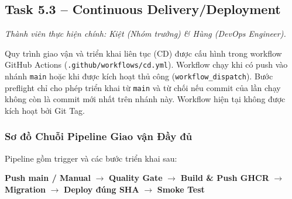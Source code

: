 \documentclass[a4paper]{article}
\begin{document}
\subsection{Task 5.3 – Continuous Delivery/Deployment}

\noindent\textit{Thành viên thực hiện chính: Kiệt (Nhóm trưởng) \& Hùng (DevOps Engineer).}

Quy trình giao vận và triển khai liên tục (CD) được cấu hình trong workflow GitHub Actions (\texttt{.github/workflows/cd.yml}). Workflow chạy khi có push vào nhánh \texttt{main} hoặc khi được kích hoạt thủ công (\texttt{workflow\_dispatch}). Bước preflight chỉ cho phép triển khai từ \texttt{main} và từ chối nếu commit của lần chạy không còn là commit mới nhất trên nhánh này. Workflow hiện tại không được kích hoạt bởi Git Tag.

\subsubsection{Sơ đồ Chuỗi Pipeline Giao vận Đầy đủ}

Pipeline gồm trigger và các bước triển khai sau:

\begin{center}
\textbf{Push main / Manual} $\longrightarrow$ \textbf{Quality Gate} $\longrightarrow$ \textbf{Build \& Push GHCR} $\longrightarrow$ \textbf{Migration} $\longrightarrow$ \textbf{Deploy đúng SHA} $\longrightarrow$ \textbf{Smoke Test}
\end{center}
\end{document}
